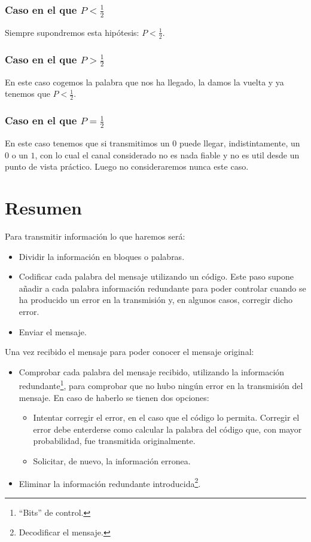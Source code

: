 \subsubsection{Caso en el que $P<\frac{1}{2}$}

Siempre supondremos esta hip\'otesis: $P<\frac{1}{2}$.

\subsubsection{Caso en el que $P>\frac{1}{2}$}

En este caso cogemos la palabra que nos ha llegado, la damos la vuelta y ya
tenemos que $P<\frac{1}{2}$.

\subsubsection{Caso en el que $P=\frac{1}{2}$}

En este caso tenemos que si transmitimos un $0$ puede llegar, indistintamente,
un $0$ o un $1$, con lo cual el canal considerado no es nada fiable y no es
util desde un punto de vista pr\'actico. Luego no consideraremos nunca
este caso.

\section{Resumen}

Para transmitir informaci\'on lo que haremos ser\'a:
\begin{itemize}
\item Dividir la informaci\'on en bloques o palabras.
\item Codificar cada palabra del mensaje utilizando un c\'odigo. Este paso
supone a\~nadir a cada palabra informaci\'on redundante para poder controlar
cuando se ha producido un error en la transmisi\'on y, en algunos casos,
corregir dicho error.
\item Enviar el mensaje.
\end{itemize}
%
\newpage
%
Una vez recibido el mensaje para poder conocer el mensaje original:
\begin{itemize}
\item Comprobar cada palabra del mensaje recibido, utilizando la informaci\'on
redundante\footnote{``Bits'' de control.}, para comprobar que no hubo ning\'un
error en la transmisi\'on del mensaje. En caso de haberlo se tienen dos
opciones:
\begin{itemize}
\item Intentar corregir el error, en el caso que el c\'odigo lo permita.
Corregir el error debe enterderse como calcular la palabra del c\'odigo que,
con mayor probabilidad, fue transmitida originalmente.
\item Solicitar, de nuevo, la informaci\'on erronea.
\end{itemize}
\item Eliminar la informaci\'on redundante introducida\footnote{Decodificar el
mensaje.}.
\end{itemize}

